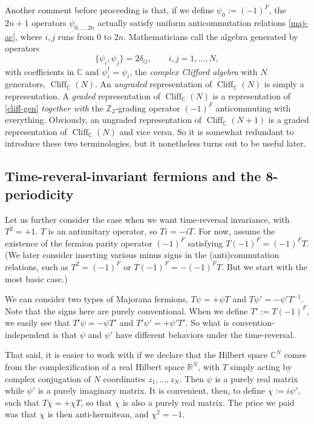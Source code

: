 \documentclass[12pt]{article}
\numberwithin{equation}{section}
\numberwithin{figure}{section}
\theoremstyle{remark}
\def\bC{\mathbb{C}}
\def\bR{\mathbb{R}}
\def\bZ{\mathbb{Z}}
\def\Cliff{\mathop{\mathrm{Cliff}}\nolimits}
\begin{document}
Another comment before proceeding is that, if we define
$\psi_0:=(-1)^F$, the $2n+1$ operators $\psi_{0,\ldots, 2n}$ actually satisfy
uniform anticommutation relations \eqref{maj-ac},
where $i,j$ runs from $0$ to $2n$.
Mathematicians call the algebra generated by operators \begin{equation}
\{\psi_i,\psi_j\}=2\delta_{ij},\qquad i,j=1,\ldots,N, \label{cliff-gen}
\end{equation} with coefficients in $\bC$ and $\psi_i^\dagger=\psi_i$,
the \emph{complex Clifford algebra} with $N$ generators, $\Cliff_\bC(N)$.
An \emph{ungraded} representation of $\Cliff_\bC(N)$ is simply a representation.
A \emph{graded} representation of $\Cliff_\bC(N)$ is a representation of 
\eqref{cliff-gen} \emph{together with} the $\bZ_2$-grading operator $(-1)^F$
anticommuting with everything.
Obviously, an ungraded representation of $\Cliff_\bC(N+1)$ 
is a graded representation of $\Cliff_\bC(N)$ and vice versa.
So it is somewhat redundant to introduce these two terminologies,
but it  nonetheless turns out to be useful later.



\subsection{Time-reveral-invariant fermions and the 8-periodicity}

Let us further consider the case when we want time-reversal invariance, with $T^2=+1$.
$T$ is an antiunitary operator, so $Ti=-iT$.
For now, assume the existence of the fermion parity operator $(-1)^F$ satisfying
$T(-1)^F = (-1)^FT$.
(We later consider inserting various minus signs in the (anti)commutation relations,
such as $T^2=(-1)^F$ or $T(-1)^F=-(-1)^FT$. 
But we start with the most basic case.)

We can consider two types of Majorana fermions, $T\psi =+\psi T$ and $T\psi'  = -\psi'T^{-1}$.
Note that the signs here are purely conventional.
When we define $T' :=T(-1)^F$,
we easily see that $T'\psi = -\psi T'$ and $T'\psi' = + \psi' T'$.
So what is convention-independent is that $\psi$ and $\psi'$ have different behaviors under the time-reversal.

That said, it is easier to work with if we declare that the Hilbert space $\bC^N$ comes from
the complexification of a real Hilbert space $\bR^N$, with $T$ 
simply acting by complex conjugation of $N$ coordinates $z_1,\ldots,z_N$.
Then $\psi$ is a purely real matrix while $\psi'$ is a purely imaginary matrix.
It is convenient, then, to define $\chi := i\psi'$, such that $T\chi = +\chi T$,
so that $\chi$ is also a purely real matrix.
The price we paid was that $\chi$ is then anti-hermitean, and $\chi^2=-1$.
\end{document}
